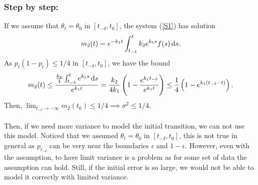 \documentclass[aspectratio=169]{beamer}\usepackage[utf8]{inputenc}
\begin{document}
\begin{frame}\frametitle{Step by step:}

If we assume that $\theta_t=\theta_0$ in $[t_{-\delta},t_0]$, the system (\ref{S1}) has solution
\begin{equation*}
m_2({t})=e^{-k_1{t}}\int_{t_{-\delta}}^{{t}}k_2e^{k_1s}f(s)\dif s.
\end{equation*}
As $p_t(1-p_t)\leq1/4$ in $[t_{-\delta},t_0]$, we have the bound
\begin{equation*}
m_2({t})\leq\frac{\frac{k_2}{4}\int_{t_{-\delta}}^{{t}}e^{k_1s}\dif s}{e^{k_1{t}}}=\frac{k_2}{4k_1}\left(1-\frac{e^{k_1t_{-\delta}}}{e^{k_1{t}}}\right)\leq\frac{1}{4}\left(1-e^{k_1(t_{-\delta}-t)}\right).
\end{equation*}
Then, $\lim_{t_{-\delta}\to-\infty}m_2(t_0)\leq 1/4\implies\sigma^2\leq1/4$.\\
\quad\\
{\footnotesize
Then, if we need more variance to model the initial transition, we can not use this model. Noticed that we assumed $\theta_t=\theta_0$ in $[t_{-\delta},t_0]$, this is not true in general as $p_{t_{-\delta}}$ can be very near the boundaries $\epsilon$ and $1-\epsilon$. However, even with the assumption, to have limit variance is a problem as for some set of data the assumption can hold. Still, if the initial error is so large, we would not be able to model it correctly with limited variance.}
\end{frame}
\end{document}
